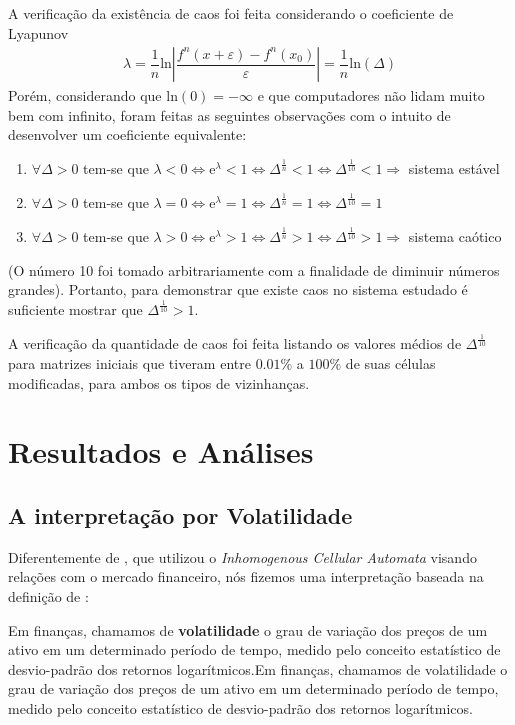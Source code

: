 \documentclass[
	12pt,				%
	openright,			%
	twoside,			%
	a4paper,			%
	english,			%
	french,				%
	spanish,			%
	brazil				%
	]{abntex2}
\begin{document}
  A verificação da existência de caos foi feita considerando o coeficiente de Lyapunov
  \begin{align}
    \lambda = \dfrac{1}{n} \mathrm{ln}\left|\dfrac{f^n(x+\varepsilon) - f^n(x_0)}{\varepsilon}\right| = \dfrac{1}{n} \mathrm{ln}(\Delta)
  \end{align}
  Porém, considerando que $\mathrm{ln}(0)=-\infty$ e que computadores não lidam muito bem com infinito, foram feitas as seguintes observações com o intuito de desenvolver um coeficiente equivalente:
  \begin{enumerate}
    \item $\forall \Delta > 0$ tem-se que $\lambda < 0 \Leftrightarrow \mathrm{e}^\lambda < 1 \Leftrightarrow \Delta^\frac{1}{n} < 1 \Leftrightarrow \Delta^\frac{1}{10} < 1 \Rightarrow$ sistema estável 
    \item $\forall \Delta > 0$ tem-se que $\lambda = 0 \Leftrightarrow \mathrm{e}^\lambda = 1 \Leftrightarrow \Delta^\frac{1}{n} = 1 \Leftrightarrow \Delta^\frac{1}{10} = 1$ 
    \item $\forall \Delta > 0$ tem-se que $\lambda > 0 \Leftrightarrow \mathrm{e}^\lambda > 1 \Leftrightarrow \Delta^\frac{1}{n} > 1 \Leftrightarrow \Delta^\frac{1}{10} > 1 \Rightarrow$ sistema caótico 
  \end{enumerate}
 (O número 10 foi tomado arbitrariamente com a finalidade de diminuir números grandes). Portanto, para demonstrar que existe caos no sistema estudado é suficiente mostrar que $\Delta^\frac{1}{10} > 1$. 
 
 A verificação da quantidade de caos foi feita listando os valores médios de $\Delta^\frac{1}{10}$ para matrizes iniciais que tiveram entre $0.01\%$ a $100\%$ de suas células modificadas, para ambos os tipos de vizinhanças.



\chapter{Resultados e Análises}

\section{A interpretação por Volatilidade}

Diferentemente de , que utilizou o \textit{Inhomogenous Cellular Automata} visando relações com o mercado financeiro, nós fizemos uma interpretação baseada na definição de :
\begin{citacao}
  Em finanças, chamamos de \textbf{volatilidade} o grau de variação dos preços de um ativo em
um determinado período de tempo, medido pelo conceito estatístico de desvio-padrão dos
retornos logarítmicos.Em finanças, chamamos de volatilidade o grau de variação dos preços de um ativo em
um determinado período de tempo, medido pelo conceito estatístico de desvio-padrão dos
retornos logarítmicos. \cite{anbima3}
\end{citacao}
\end{document}
